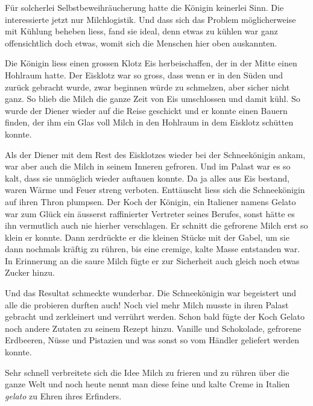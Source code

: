 Für solcherlei Selbstbeweihräucherung hatte die Königin keinerlei Sinn. Die
interessierte jetzt nur Milchlogistik. Und dass sich das Problem möglicherweise
mit Kühlung beheben liess, fand sie ideal, denn etwas zu kühlen war ganz
offensichtlich doch etwas, womit sich die Menschen hier oben auskannten.  

Die Königin liess einen grossen Klotz Eis herbeischaffen, der in der Mitte einen Hohlraum hatte. Der Eisklotz war so gross, dass wenn er in den Süden und zurück gebracht wurde, zwar beginnen würde zu schmelzen, aber sicher nicht ganz. So blieb die Milch die ganze Zeit von Eis umschlossen und damit kühl. So wurde der Diener wieder auf die Reise geschickt und er konnte einen Bauern finden, der ihm ein Glas voll Milch in den Hohlraum in dem Eisklotz schütten konnte.

Als der Diener mit dem Rest des Eisklotzes wieder bei der Schneekönigin ankam,
war aber auch die Milch in seinem Inneren gefroren. Und im Palast war es so
kalt, dass sie unmöglich wieder auftauen konnte. Da ja alles aus Eis bestand,
waren Wärme und Feuer streng verboten. Enttäuscht liess sich die Schneekönigin
auf ihren Thron plumpsen. Der Koch der Königin, ein Italiener namens Gelato war
zum Glück ein äusserst raffinierter Vertreter seines Berufes, sonst hätte es
ihn vermutlich auch nie hierher verschlagen. Er schnitt die gefrorene Milch erst so klein er konnte. Dann zerdrückte er die kleinen Stücke mit der Gabel, um sie dann nochmals kräftig zu rühren, bis eine cremige, kalte Masse entstanden war. In Erinnerung an die saure Milch fügte er zur Sicherheit auch gleich noch etwas Zucker hinzu.

Und das Resultat schmeckte wunderbar. Die Schneekönigin war begeistert und alle
die probieren durften auch! Noch viel mehr Milch musste in ihren Palast
gebracht und zerkleinert und verrührt werden. Schon bald fügte der Koch Gelato
noch andere Zutaten zu seinem Rezept hinzu. Vanille und Schokolade, gefrorene Erdbeeren, Nüsse und Pistazien und was sonst so vom Händler geliefert werden konnte.

Sehr schnell verbreitete sich die Idee Milch zu frieren und zu rühren über die ganze Welt und noch heute nennt man diese feine und kalte Creme in Italien {\itshape gelato} zu Ehren ihres Erfinders.  \hfill {\color{DeepPink}\decofourleft}
